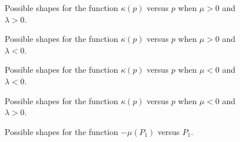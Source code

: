 \documentclass{IEEEtran}
\begin{document}
\begin{appendices}
\begin{figure}[htbp]
	\centering
	\qquad
	\caption{Possible shapes for the function $\kappa(p)$ versus $p$ when $\mu>0$ and $\lambda>0$.}
	\label{appendix1}
\end{figure}

\begin{figure}[htbp]
	\centering
	\qquad
	\caption{Possible shapes for the function $\kappa(p)$ versus $p$ when $\mu>0$ and $\lambda<0$.}
	\label{appendix2}
\end{figure}


\begin{figure}[tbp]
	\vspace{-0.7 em}
	\caption{Possible shapes for the function $\kappa(p)$ versus $p$ when $\mu<0$ and $\lambda<0$.}
	\label{appendix3}
\end{figure}


\begin{figure}[htbp]
	\centering
	\qquad
	\caption{Possible shapes for the function $\kappa(p)$ versus $p$ when $\mu<0$ and $\lambda>0$.}
	\label{appendix4}
\end{figure}

\begin{figure}[htbp]
	\centering
	\qquad
	\caption{Possible shapes for the function $-\mu(P_{1})$ versus $P_{1}$.}
	\label{appendix5}
\end{figure}


\end{appendices}





\end{document}
